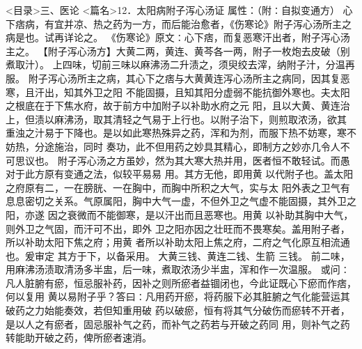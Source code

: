\documentclass[a4paper,12pt,UTF8,twoside]{ctexbook}
\begin{document}
<目录>三、医论
<篇名>12．太阳病附子泻心汤证
属性：（附∶自拟变通方） 
心下痞病，有宜并凉、热之药为一方，而后能治愈者，《伤寒论》附子泻心汤所主之病是也。试再详论之。 
《伤寒论》原文∶心下痞，而复恶寒汗出者，附子泻心汤主之。 
【附子泻心汤方】大黄二两，黄连、黄芩各一两，附子一枚炮去皮破（别煮取汁）。 
上四味，切前三味以麻沸汤二升渍之，须臾绞去滓，纳附子汁，分温再服。 
附子泻心汤所主之病，其心下之痞与大黄黄连泻心汤所主之病同，因其复恶寒，且汗出，知其外卫之阳 
不能固摄，且知其阳分虚弱不能抗御外寒也。夫太阳之根底在于下焦水府，故于前方中加附子以补助水府之元 
阳，且以大黄、黄连治上，但渍以麻沸汤，取其清轻之气易于上行也。以附子治下，则煎取浓汤，欲其 
重浊之汁易于下降也。是以如此寒热殊异之药，浑和为剂，而服下热不妨寒，寒不妨热，分途施治，同时 
奏功，此不但用药之妙具其精心，即制方之妙亦几令人不可思议也。 
附子泻心汤之方虽妙，然为其大寒大热并用，医者恒不敢轻试。而愚对于此方原有变通之法，似较平易易 
用。其方无他，即用黄 以代附子也。盖太阳之府原有二，一在膀胱、一在胸中，而胸中所积之大气，实与太 
阳外表之卫气有息息密切之关系。气原属阳，胸中大气一虚，不但外卫之气虚不能固摄，其外卫之阳，亦遂 
因之衰微而不能御寒，是以汗出而且恶寒也。用黄 以补助其胸中大气，则外卫之气固，而汗可不出，即外 
卫之阳亦因之壮旺而不畏寒矣。盖用附子者，所以补助太阳下焦之府；用黄 
者所以补助太阳上焦之府，二府之气化原互相流通也。爰审定 
其方于下，以备采用。 
大黄三钱、黄连二钱、生箭 三钱。 
前二味，用麻沸汤渍取清汤多半盅，后一味，煮取浓汤少半盅，浑和作一次温服。 
或问∶凡人脏腑有瘀，恒忌服补药，因补之则所瘀者益锢闭也，今此证既心下瘀而作痞，何以复用 
黄以易附子乎？答曰∶凡用药开瘀，将药服下必其脏腑之气化能营运其破药之力始能奏效，若但知重用破 
药以破瘀，恒有将其气分破伤而瘀转不开者，是以人之有瘀者，固忌服补气之药，而补气之药若与开破之药同 
用，则补气之药转能助开破之药，俾所瘀者速消。 
\end{document}
